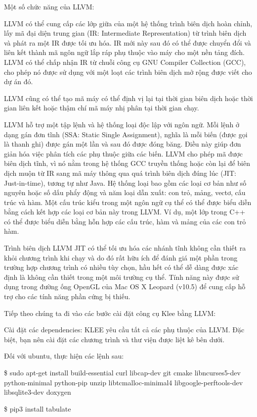 \documentclass[12pt,a4paper]{article}
\begin{document}
Một số chức năng của LLVM:

LLVM có thể cung cấp các lớp giữa của một hệ thống trình biên dịch hoàn chỉnh, lấy mã đại diện trung gian (IR: Intermediate Representation) từ trình biên dịch và phát ra một IR được tối ưu hóa. IR mới này sau đó có thể được chuyển đổi và liên kết thành mã ngôn ngữ lắp ráp phụ thuộc vào máy cho một nền tảng đích. LLVM có thể chấp nhận IR từ chuỗi công cụ GNU Compiler Collection (GCC), cho phép nó được sử dụng với một loạt các trình biên dịch mở rộng được viết cho dự án đó.

LLVM cũng có thể tạo mã máy có thể định vị lại tại thời gian biên dịch hoặc thời gian liên kết hoặc thậm chí mã máy nhị phân tại thời gian chạy.

LLVM hỗ trợ một tập lệnh và hệ thống loại độc lập với ngôn ngữ. Mỗi lệnh ở dạng gán đơn tĩnh (SSA: Static Single Assignment), nghĩa là mỗi biến (được gọi là thanh ghi) được gán một lần và sau đó được đóng băng. Điều này giúp đơn giản hóa việc phân tích các phụ thuộc giữa các biến. LLVM cho phép mã được biên dịch tĩnh, vì nó nằm trong hệ thống GCC truyền thống hoặc còn lại để biên dịch muộn từ IR sang mã máy thông qua quá trình biên dịch đúng lúc (JIT: Just-in-time), tương tự như Java. Hệ thống loại bao gồm các loại cơ bản như số nguyên hoặc số dấu phẩy động và năm loại dẫn xuất: con trỏ, mảng, vectơ, cấu trúc và hàm. Một cấu trúc kiểu trong một ngôn ngữ cụ thể có thể được biểu diễn bằng cách kết hợp các loại cơ bản này trong LLVM. Ví dụ, một lớp trong C++ có thể được biểu diễn bằng hỗn hợp các cấu trúc, hàm và mảng của các con trỏ hàm.

Trình biên dịch LLVM JIT có thể tối ưu hóa các nhánh tĩnh không cần thiết ra khỏi chương trình khi chạy và do đó rất hữu ích để đánh giá một phần trong trường hợp chương trình có nhiều tùy chọn, hầu hết có thể dễ dàng được xác định là không cần thiết trong một môi trường cụ thể. Tính năng này được sử dụng trong đường ống OpenGL của Mac OS X Leopard (v10.5) để cung cấp hỗ trợ cho các tính năng phần cứng bị thiếu.

Tiếp theo chúng ta đi vào các bước cài đặt công cụ Klee bằng LLVM:

Cài đặt các dependencies: KLEE yêu cầu tất cả các phụ thuộc của LLVM. Đặc biệt, bạn nên cài đặt các chương trình và thư viện được liệt kê bên dưới.

Đối với ubuntu, thực hiện các lệnh sau:

\begin{framed}
\$ sudo apt-get install build-essential curl libcap-dev git cmake libncurses5-dev python-minimal python-pip unzip libtcmalloc-minimal4 libgoogle-perftools-dev libsqlite3-dev doxygen

\$ pip3 install tabulate
\end{framed}
\end{document}
